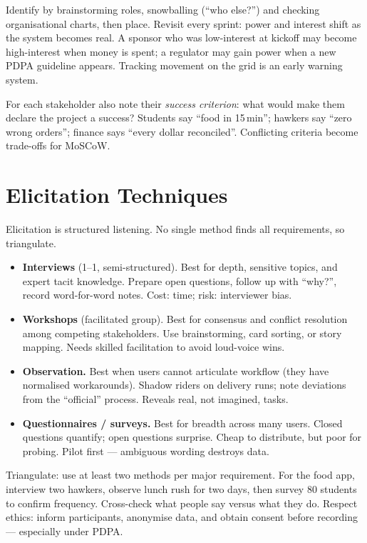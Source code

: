 Identify by brainstorming roles, snowballing (``who else?'') and checking organisational charts, then place. Revisit every sprint: power and interest shift as the system becomes real. A sponsor who was low-interest at kickoff may become high-interest when money is spent; a regulator may gain power when a new PDPA guideline appears. Tracking movement on the grid is an early warning system.

For each stakeholder also note their \emph{success criterion}: what would make them declare the project a success? Students say ``food in 15\,min''; hawkers say ``zero wrong orders''; finance says ``every dollar reconciled''. Conflicting criteria become trade-offs for MoSCoW.

\section{Elicitation Techniques}
\label{sec:elicitation}
Elicitation is structured listening. No single method finds all requirements, so triangulate.

\begin{itemize}[leftmargin=*]
    \item \textbf{Interviews} (1--1, semi-structured). Best for depth, sensitive topics, and expert tacit knowledge. Prepare open questions, follow up with ``why?'', record word-for-word notes. Cost: time; risk: interviewer bias.
    \item \textbf{Workshops} (facilitated group). Best for consensus and conflict resolution among competing stakeholders. Use brainstorming, card sorting, or story mapping. Needs skilled facilitation to avoid loud-voice wins.
    \item \textbf{Observation.} Best when users cannot
    articulate workflow (they have normalised workarounds).
    Shadow riders on delivery runs; note deviations from the
    ``official'' process. Reveals real, not imagined, tasks.
    \item \textbf{Questionnaires / surveys.} Best for breadth across many users. Closed questions quantify; open questions surprise. Cheap to distribute, but poor for probing. Pilot first --- ambiguous wording destroys data.
\end{itemize}

Triangulate: use at least two methods per major requirement. For the food app, interview two hawkers, observe lunch rush for two days, then survey 80 students to confirm frequency. Cross-check what people say versus what they do. Respect ethics: inform participants, anonymise data, and obtain consent before recording --- especially under PDPA.

